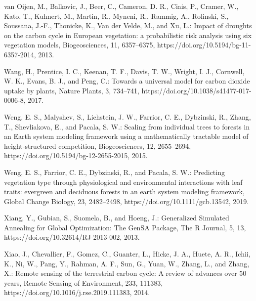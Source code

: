 \documentclass[gmd, manuscript]{copernicus}
\begin{document}
\begin{thebibliography}{}
van Oijen, M., Balkovic, J., Beer, C., Cameron, D. R., Ciais, P., Cramer, W., Kato, T., Kuhnert, M., Martin, R., Myneni, R., Rammig, A., Rolinski, S., Soussana, J.-F., Thonicke, K., Van der Velde, M., and Xu, L.: Impact of droughts on the carbon cycle in European vegetation: a probabilistic risk analysis using six vegetation models, Biogeosciences, 11, 6357–6375, https://doi.org/10.5194/bg-11-6357-2014, 2013.

Wang, H., Prentice, I. C., Keenan, T. F., Davis, T. W., Wright, I. J., Cornwell, W. K., Evans, B. J., and Peng, C.: Towards a universal model for carbon dioxide uptake by plants, Nature Plants, 3, 734–741, https://doi.org/10.1038/s41477-017-0006-8, 2017.

Weng, E. S., Malyshev, S., Lichstein, J. W., Farrior, C. E., Dybzinski, R., Zhang, T., Shevliakova, E., and Pacala, S. W.: Scaling from individual trees to forests in an Earth system modeling framework using a mathematically tractable model of height-structured competition, Biogeosciences, 12, 2655–2694, https://doi.org/10.5194/bg-12-2655-2015, 2015.

Weng, E. S., Farrior, C. E., Dybzinski, R., and Pacala, S. W.: Predicting vegetation type through physiological and environmental interactions with leaf traits: evergreen and deciduous forests in an earth system modeling framework, Global Change Biology, 23, 2482–2498, https://doi.org/10.1111/gcb.13542, 2019.

Xiang, Y., Gubian, S., Suomela, B., and Hoeng, J.: Generalized Simulated Annealing for Global Optimization: The GenSA Package, The R Journal, 5, 13, https://doi.org/10.32614/RJ-2013-002, 2013.

Xiao, J., Chevallier, F., Gomez, C., Guanter, L., Hicke, J. A., Huete, A. R., Ichii, K., Ni, W., Pang, Y., Rahman, A. F., Sun, G., Yuan, W., Zhang, L., and Zhang, X.: Remote sensing of the terrestrial carbon cycle: A review of advances over 50 years, Remote Sensing of Environment, 233, 111383, https://doi.org/10.1016/j.rse.2019.111383, 2014.

\end{thebibliography}

\end{document}
